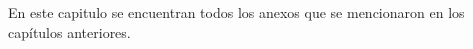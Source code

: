 \appendix 
En este capitulo se encuentran todos los anexos que se mencionaron en los 
capítulos anteriores.












